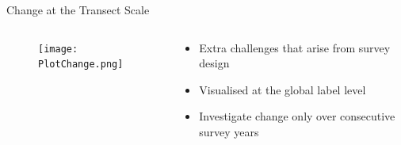\documentclass{beamer}
\begin{document}

             \begin{frame}{Change at the Transect Scale}
               \begin{columns}[T]
                 \begin{column}{0.48\textwidth}
                   \centering
                    \begin{figure}
                        \centering
                        \texttt{[image: PlotChange.png]}
                   \end{figure}
                 \end{column}
                 \begin{column}{0.48\textwidth}
                   \centering
                    \begin{itemize}
                      \item Extra challenges that arise from survey design
                      \item Visualised at the global label level
                      \item Investigate change only over consecutive survey years
                    \end{itemize}
                 \end{column}
              \end{columns}
             \end{frame}
\end{document}
